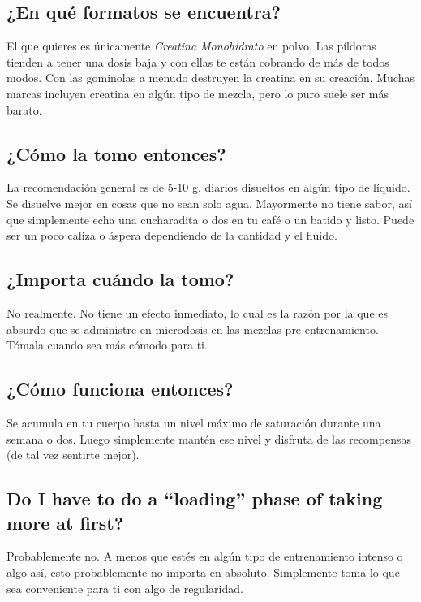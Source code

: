 \documentclass{article}
\begin{document}
\subsection{¿En qué formatos se encuentra?}

El que quieres es únicamente \textit{Creatina Monohidrato} en polvo. Las píldoras tienden a tener una dosis baja y con ellas te están cobrando de más de todos modos. Con las gominolas a menudo destruyen la creatina en su creación. Muchas marcas incluyen creatina en algún tipo de mezcla, pero lo puro suele ser más barato.

\subsection{¿Cómo la tomo entonces?}

La recomendación general es de 5-10 g. diarios disueltos en algún tipo de líquido. Se disuelve mejor en cosas que no sean solo agua. Mayormente no tiene sabor, así que simplemente echa una cucharadita o dos en tu café o un batido y listo. Puede ser un poco caliza o áspera dependiendo de la cantidad y el fluido.

\subsection{¿Importa cuándo la tomo?}

No realmente. No tiene un efecto inmediato, lo cual es la razón por la que es absurdo que se administre en microdosis en las mezclas pre-entrenamiento. Tómala cuando sea más cómodo para ti.

\subsection{¿Cómo funciona entonces?}

Se acumula en tu cuerpo hasta un nivel máximo de saturación durante una semana o dos. Luego simplemente mantén ese nivel y disfruta de las recompensas (de tal vez sentirte mejor).

\subsection{Do I have to do a “loading” phase of taking more at first?}

Probablemente no. A menos que estés en algún tipo de entrenamiento intenso o algo así, esto probablemente no importa en absoluto. Simplemente toma lo que sea conveniente para ti con algo de regularidad.
\end{document}
